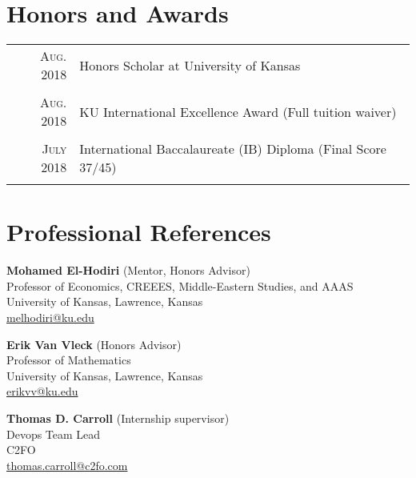 \documentclass[a4paper,10pt]{article}
\begin{document}
\section{Honors and Awards}
\begin{tabular}{rl}
	\textsc{Aug.} 2018 & Honors Scholar at University of Kansas                                    \\\\
	\textsc{Aug.} 2018 & KU International Excellence Award \footnotesize{(Full tuition waiver)}    \\\\
	\textsc{July} 2018 & International Baccalaureate (IB) Diploma \footnotesize(Final Score 37/45) \\\\
\end{tabular}

\section{Professional References}

\textbf{Mohamed El-Hodiri} (Mentor, Honors Advisor)\\
Professor of Economics, CREEES, Middle-Eastern Studies, and AAAS\\
University of Kansas, Lawrence, Kansas\\
\href{mailto:melhodiri@ku.edu}{melhodiri@ku.edu}

\textbf{Erik Van Vleck} (Honors Advisor)\\
Professor of Mathematics\\
University of Kansas, Lawrence, Kansas\\
\href{mailto:erikvv@ku.edu}{erikvv@ku.edu}

\textbf{Thomas D. Carroll} (Internship supervisor)\\
Devops Team Lead\\
C2FO\\
\href{mailto:thomas.carroll@c2fo.com}{thomas.carroll@c2fo.com}
\end{document}
